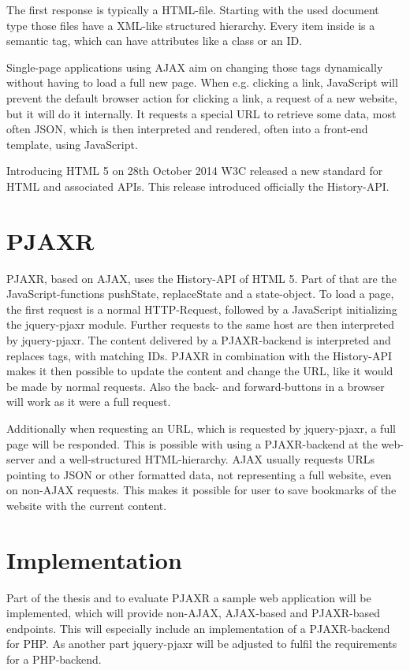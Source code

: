 \documentclass[f,bachelor,binding,twoside,palatino]{WeSTthesis}
\def \ajax {AJAX}
\def \pjaxr {PJAXR}
\def \jqueryPjaxr {jquery-pjaxr}
\def \SinglePageApplication {Single-page application}
\begin{document}
  The first response is typically a HTML-file.
  Starting with the used document type those files have a XML-like structured hierarchy.
  Every item inside is a semantic tag, which can have attributes like a class or an ID.

  \SinglePageApplication{}s using \ajax{} aim on changing those tags dynamically without having to load a full new page.
  When e.g. clicking a link, JavaScript will prevent the default browser action for clicking a link, a request of a new website, but it will do it internally.
  It requests a special URL to retrieve some data, most often JSON, which is then interpreted and rendered, often into a front-end template, using JavaScript.

  Introducing HTML 5 on 28th October 2014 W3C released a new standard for HTML and associated APIs. 
  This release introduced officially the History-API.
  
\section{\pjaxr{}}
  \pjaxr{}, based on \ajax{}, uses the History-API of HTML 5.
  Part of that are the JavaScript-functions pushState, replaceState and a state-object.
  To load a page, the first request is a normal HTTP-Request, followed by a JavaScript initializing the \jqueryPjaxr{} module.
  Further requests to the same host are then interpreted by \jqueryPjaxr{}.
  The content delivered by a \pjaxr{}-backend is interpreted and replaces tags, with matching IDs.
  \pjaxr{} in combination with the History-API makes it then possible to update the content and change the URL, like it would be made by normal requests.
  Also the back- and forward-buttons in a browser will work as it were a full request.
  
  Additionally when requesting an URL, which is requested by \jqueryPjaxr{}, a full page will be responded.
  This is possible with using a \pjaxr{}-backend at the web-server and a well-structured HTML-hierarchy.
  \ajax{} usually requests URLs pointing to JSON or other formatted data, not representing a full website, even on non-\ajax{} requests.
  This makes it possible for user to save bookmarks of the website with the current content.

\section{Implementation}
  Part of the thesis and to evaluate \pjaxr{} a sample web application will be implemented, which will provide non-\ajax{}, \ajax{}-based and \pjaxr{}-based endpoints.
  This will especially include an implementation of a \pjaxr{}-backend for PHP. As another part \jqueryPjaxr{} will be adjusted to fulfil the requirements for a PHP-backend.
\end{document}
